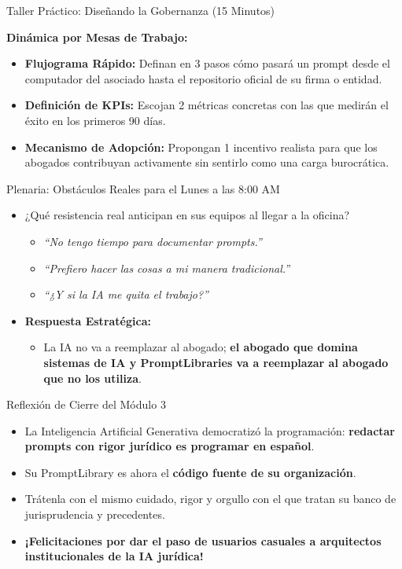 \documentclass[aspectratio=169]{beamer}
\begin{document}
\begin{frame}{Taller Práctico: Diseñando la Gobernanza (15 Minutos)}

\textbf{Dinámica por Mesas de Trabajo:}
\begin{itemize}
  \item \textbf{Flujograma Rápido:} Definan en 3 pasos cómo pasará un prompt desde el computador del asociado hasta el repositorio oficial de su firma o entidad.
  \item \textbf{Definición de KPIs:} Escojan 2 métricas concretas con las que medirán el éxito en los primeros 90 días.
  \item \textbf{Mecanismo de Adopción:} Propongan 1 incentivo realista para que los abogados contribuyan activamente sin sentirlo como una carga burocrática.
\end{itemize}
\end{frame}

\begin{frame}{Plenaria: Obstáculos Reales para el Lunes a las 8:00 AM}

\begin{itemize}
  \item ¿Qué resistencia real anticipan en sus equipos al llegar a la oficina?
  \begin{itemize}
    \item \textit{``No tengo tiempo para documentar prompts.''}
    \item \textit{``Prefiero hacer las cosas a mi manera tradicional.''}
    \item \textit{``¿Y si la IA me quita el trabajo?''}
  \end{itemize}
  \item \textbf{Respuesta Estratégica:}
  \begin{itemize}
    \item La IA no va a reemplazar al abogado; \textbf{el abogado que domina sistemas de IA y PromptLibraries va a reemplazar al abogado que no los utiliza}.
  \end{itemize}
\end{itemize}
\end{frame}

\begin{frame}{Reflexión de Cierre del Módulo 3}

\begin{itemize}
  \item La Inteligencia Artificial Generativa democratizó la programación: \textbf{redactar prompts con rigor jurídico es programar en español}.
  \item Su PromptLibrary es ahora el \textbf{código fuente de su organización}.
  \item Trátenla con el mismo cuidado, rigor y orgullo con el que tratan su banco de jurisprudencia y precedentes.
  \item \textbf{¡Felicitaciones por dar el paso de usuarios casuales a arquitectos institucionales de la IA jurídica!}
\end{itemize}
\end{frame}
\end{document}
